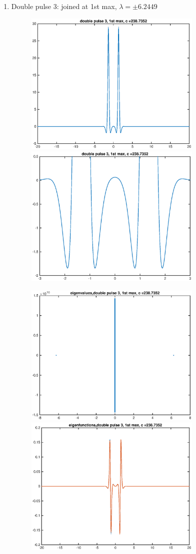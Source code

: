 \documentclass[12pt]{article}
\begin{document}
\begin{enumerate}
	\item Double pulse 3: joined at 1st max, $\lambda = \pm 6.2449$
	\begin{figure}[H]
	\includegraphics[width=8.5cm]{1double3.eps}
	\includegraphics[width=8.5cm]{1double3zoom.eps}
	\end{figure}
	\begin{figure}[H]
	\includegraphics[width=8.5cm]{1double3eig.eps}
	\includegraphics[width=8.5cm]{1double3eigfn.eps}
	\end{figure}


\end{enumerate}
\end{document}
